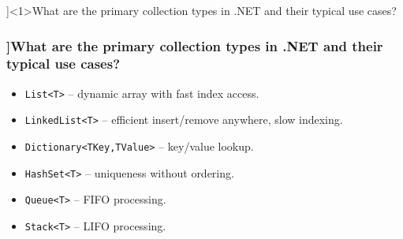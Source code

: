\QuestionSlide[\CategoryBadge[CollColor!20]{Collections}]<1>{What are the primary collection types in .NET and their typical use cases?}
\begin{frame}[fragile]
  \frametitle{\AnswerTitle[\CategoryBadge[CollColor!20]{Collections}]{What are the primary collection types in .NET and their typical use cases?}}

  {\footnotesize
    \begin{itemize}
      \item \texttt{List<T>} – dynamic array with fast index access.
      \item \texttt{LinkedList<T>} – efficient insert/remove anywhere, slow indexing.
      \item \texttt{Dictionary<TKey,TValue>} – key/value lookup.
      \item \texttt{HashSet<T>} – uniqueness without ordering.
      \item \texttt{Queue<T>} – FIFO processing.
      \item \texttt{Stack<T>} – LIFO processing.
    \end{itemize}
  }
\end{frame}
